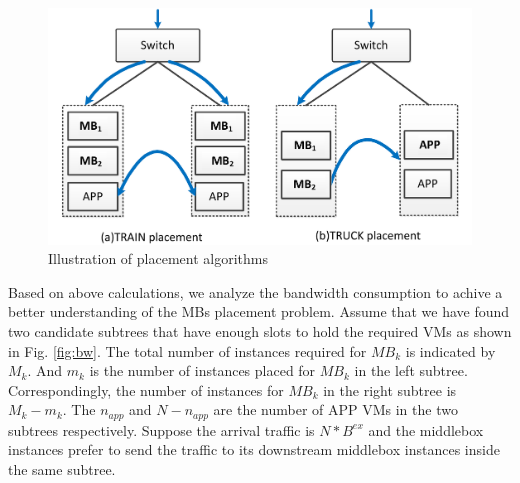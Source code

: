 \documentclass[review]{elsarticle}
\begin{document}
\begin{figure}
	\centering
	\includegraphics[width=3.5 in]{fig/train_truck.pdf}
	\caption{Illustration of placement algorithms}
	\label{fig:intuition}
\end{figure} 
Based on above calculations, we analyze the bandwidth consumption to achive a better understanding of the MBs placement problem. Assume that we have found two candidate subtrees that have enough slots to hold the required VMs as shown in Fig. \ref{fig:bw}. The total number of instances required for $MB_k$ is indicated by $M_k$. And $m_k$ is the number of instances placed for $MB_k$  in the left subtree. %
 Correspondingly, the number of instances for $MB_k$ in the right subtree is $M_k-m_k$. The $n_{app}$ and $N-n_{app}$ are the number of APP VMs in the two subtrees respectively. Suppose the arrival traffic is $N*B^{ex}$ and the middlebox instances prefer to send the traffic to its downstream middlebox instances inside the same subtree.
\end{document}
